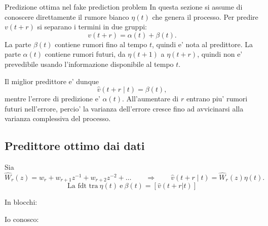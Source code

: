 \documentclass[11pt,a4paper]{article}
\begin{document}
\begin{spiegazione}{Predizione ottima nel fake prediction problem}
In questa sezione si assume di conoscere direttamente il rumore bianco $\eta(t)$ che genera il processo. Per predire $v(t+r)$ si separano i termini in due gruppi:
\[
v(t+r)=\alpha(t)+\beta(t).
\]
La parte $\beta(t)$ contiene rumori fino al tempo $t$, quindi e' nota al predittore. La parte $\alpha(t)$ contiene rumori futuri, da $\eta(t+1)$ a $\eta(t+r)$, quindi non e' prevedibile usando l'informazione disponibile al tempo $t$.

Il miglior predittore e' dunque
\[
\hat v(t+r\mid t)=\beta(t),
\]
mentre l'errore di predizione e' $\alpha(t)$. All'aumentare di $r$ entrano piu' rumori futuri nell'errore, percio' la varianza dell'errore cresce fino ad avvicinarsi alla varianza complessiva del processo.
\end{spiegazione}

\subsection{Predittore ottimo dai dati}
Sia
\[
\hat W_r(z)=w_r+w_{r+1}z^{-1}+w_{r+2}z^{-2}+\dots\qquad\Longrightarrow\qquad \hat v(t+r\mid t)=\hat W_r(z)\eta(t).
\]
\[
\text{La fdt tra} \ \eta(t) \ \text{e} \ \beta(t) = [\hat{v}(t+r|t)]
\]


In blocchi: 
\begin{center}
\end{center}

Io conosco:
\begin{center}
\end{center}
\end{document}

